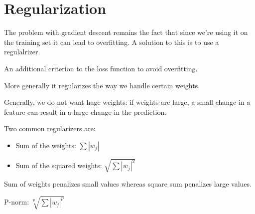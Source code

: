 
\chapter{Regularization}
The problem with gradient descent remains the fact that since we're using it on the training set it can lead to overfitting. A solution to this is to use a regulalrizer.

\begin{definition}[Regularizer]
	An additional criterion to the loss function to avoid overfitting.
\end{definition}

More generally it regularizes the way we handle certain weights.

Generally, we do not want huge weights: if weights are large, a small change in a feature can result in a large change in the prediction.

Two common regularizers are: 

\begin{itemize}
	\item Sum of the weights: $\sum |w_j|$
	\item Sum of the squared weights: $\sqrt{\sum |w_j|^2}$
\end{itemize}

Sum of weights penalizes small values whereas square sum penalizes large values. 

P-norm: $\sqrt[p]{\sum |w_j|^p}$
